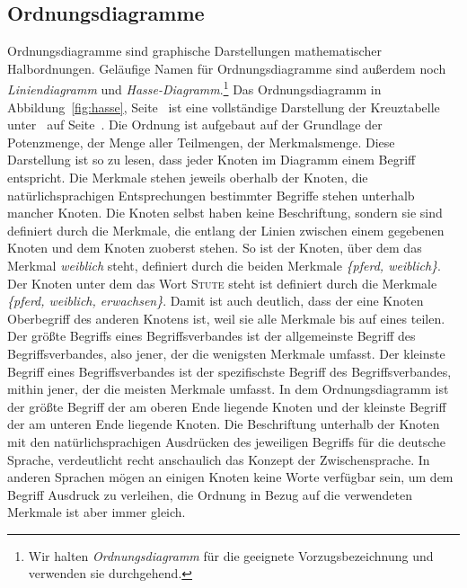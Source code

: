\documentclass[pagesize,paper=A4,DIV=calc,fontsize=12pt,draft=false]{scrreprt}
\begin{document}
\subsection{Ordnungsdiagramme}
\label{sec:hasse}
Ordnungsdiagramme sind graphische Darstellungen mathematischer Halbordnungen. 
Geläufige Namen für Ordnungsdiagramme sind außerdem noch \emph{Liniendiagramm} und \emph{Hasse-Diagramm}.\footnote{Wir halten \emph{Ordnungsdiagramm} für die geeignete Vorzugsbezeichnung und verwenden sie durchgehend.}
Das Ordnungsdiagramm in Abbildung~\ref{fig:hasse}, Seite~\pageref{fig:hasse} ist eine vollständige Darstellung der Kreuztabelle unter\emph{~} auf Seite~\pageref{subsec:fba}.
Die Ordnung ist aufgebaut auf der Grundlage der Potenzmenge, der Menge aller Teilmengen, der Merkmalsmenge.
Diese Darstellung ist so zu lesen, dass jeder Knoten im Diagramm einem Begriff entspricht.
Die Merkmale stehen jeweils oberhalb der Knoten, die natürlichsprachigen Entsprechungen bestimmter Begriffe stehen unterhalb mancher Knoten.
Die Knoten selbst haben keine Beschriftung, sondern sie sind definiert durch die Merkmale, die entlang der Linien zwischen einem gegebenen Knoten und dem Knoten zuoberst stehen.
So ist der Knoten, über dem das Merkmal \emph{weiblich} steht, definiert durch die beiden Merkmale \emph{\{pferd, weiblich\}}.
Der Knoten unter dem das Wort \textsc{Stute} steht ist definiert durch die Merkmale \emph{\{pferd, weiblich, erwachsen\}}.
Damit ist auch deutlich, dass der eine Knoten Oberbegriff des anderen Knotens ist, weil sie alle Merkmale bis auf eines teilen.
Der größte Begriffs eines Begriffsverbandes ist der allgemeinste Begriff des Begriffsverbandes, also jener, der die wenigsten Merkmale umfasst. 
Der kleinste Begriff eines Begriffsverbandes ist der spezifischste Begriff des Begriffsverbandes, mithin jener, der die meisten Merkmale umfasst. 
In dem Ordnungsdiagramm ist der größte Begriff der am oberen Ende liegende Knoten und der kleinste Begriff der am unteren Ende liegende Knoten.
Die Beschriftung unterhalb der Knoten mit den natürlichsprachigen Ausdrücken des jeweiligen Begriffs für die deutsche Sprache, verdeutlicht recht anschaulich das Konzept der Zwischensprache.
In anderen Sprachen mögen an einigen Knoten keine Worte verfügbar sein, um dem Begriff Ausdruck zu verleihen, die Ordnung in Bezug auf die verwendeten Merkmale ist aber immer gleich.


\label{fig:hasse}
\end{document}
